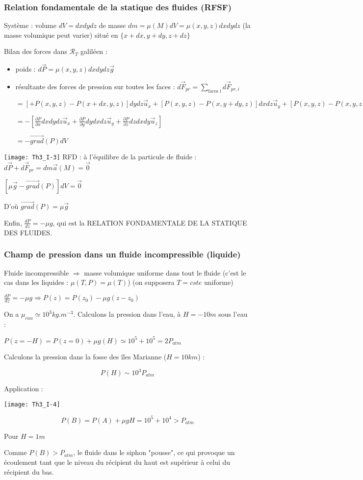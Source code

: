\documentclass[a4paper,12pt]{book}
\newcommand{\grad}{\overrightarrow{grad}}
\begin{document}
\subsubsection{Relation fondamentale de la statique des fluides (RFSF)}
Système : volume $dV=dxdydz$ de masse $dm =\mu(M)dV=\mu(x,y,z)dxdydz$ (la masse volumique peut varier) situé en $\{x+dx, y+dy, z+dz\}$
\par Bilan des forces dans $\mathcal{R}_T$ galiléen :\begin{itemize}
\item poids : $d\vec{P}=\mu(x,y,z)dxdydz\vec{g}$
\item résultante des forces de pression sur toutes les faces : $d\vec{F}_{pr} = \sum\limits_{\text{faces i}}d\vec{F}_{pr,i}$\par$ = [+ P(x,y,z)-P(x+dx,y,z)]dydz\vec{u}_x+[P(x,y,z)-P(x,y+dy,z)]dxdz\vec{u}_y+[P(x,y,z)-P(x,y,z+dz)]dxdy\vec{u}_z$ \par $=-\left[\frac{\partial P}{\partial x}dxdydz\vec{u}_x+\frac{\partial P}{\partial y}dydxdz\vec{u}_y+\frac{\partial P}{\partial z}dzdxdy\vec{u}_z\right]$ \par $= -\overrightarrow{grad}(P)dV$
\end{itemize}
\texttt{[image: Th3\_I-3]}
RFD : à l'équilibre de la particule de fluide : $d\vec{P}+d\vec{F}_{pr}=dm\vec{a}(M)=\vec{0}$
\par $[\mu\vec{g}-\overrightarrow{grad}(P)]dV=\vec{0}$
\par D'où $\grad(P)=\mu\vec{g}$
\par Enfin, $\frac{dP}{dz}=-\mu g$, qui est la RELATION FONDAMENTALE DE LA STATIQUE DES FLUIDES.

\subsubsection{Champ de pression dans un fluide incompressible (liquide)}
Fluide incompressible $\Rightarrow$ masse volumique uniforme dans tout le fluide (c'est le cas dans les liquides : $\mu(T,P)=\mu(T)$) (on supposera $T=cste$ uniforme)
\par $\frac{dP}{dz}=-\mu g \Rightarrow P(z)=P(z_0)-\mu g(z-z_0)$
\par On a $\mu_{eau}\simeq 10^3 kg.m^{-3}$. Calculons la pression dans l'eau, à $H = -10m$ sous l'eau : \par $P(z=-H) = P(z=0)+ \mu g(H) \simeq 10^5 + 10^5 = 2P_{atm}$
\par Calculons la pression dans la fosse des îles Marianne ($H=10 km$) :
\par $$ P(H)\sim 10^3P_{atm} $$
\par Application :
\par \texttt{[image: Th3\_I-4]}
\par $$ P(B) = P(A) + \mu g H = 10^5 + 10^4 > P_{atm} $$
\par Pour $H=1m$
\par Comme $P(B)>P_{atm}$, le fluide dans le siphon "pousse", ce qui provoque un écoulement tant que le niveau du récipient du haut est supérieur à celui du récipient du bas.
\end{document}
